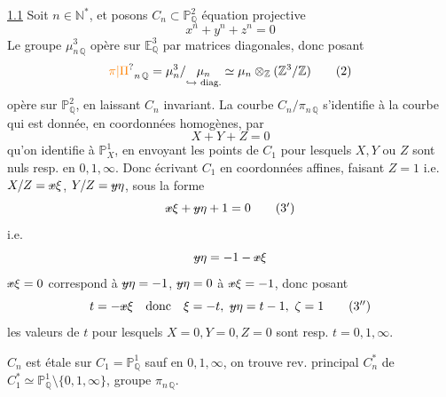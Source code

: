 \uline{1.1} Soit $n\in\mathbb N^*$, et posons
$C_n\subset\mathbb P^2_{\mathbb Q}$ équation projective
\[
x^n+y^n+z^n=0\tag*{(1)}
\]
Le groupe $\mu_{n\,\mathbb Q}^{3}$ opère sur $\mathbb E^3_{\mathbb Q}$ par matrices diagonales,
donc posant
\[
\unsure{\pi|\Pi}_{n\,\mathbb Q}=\mu_n^3/\underset{\text{\scriptsize$\hookrightarrow$ diag.}}{\mu_n}\simeq
\mu_n\otimes_{\mathbb Z}(\mathbb Z^3/\mathbb Z)\tag*{(2)}
\]
opère sur $\mathbb P^2_{\mathbb Q}$, en laissant $C_n$ invariant. La
courbe $C_n/\pi_{n\,\mathbb Q}$ s'identifie à la courbe  qui est
donnée, en coordonnées homogènes, par
\[
X+Y+Z=0\tag*{(3)}
\]
qu'on identifie à $\mathbb P^1_{X}$, en envoyant les
points de $C_1$ pour lesquels $X,Y$ ou $Z$ sont
nuls resp. en $0,1,\infty$. Donc écrivant $C_1$
en coordonnées affines, faisant $Z=1$
i.e. $X/Z=\deleted{x}\xi$, $Y/Z=\deleted{y}\eta$, sous la forme
\[
\deleted{x}\xi+\deleted{y}\eta+1=0\tag*{($3'$)}
\]
i.e.
\[
\deleted{y}\eta=-1-\deleted{x}\xi
\]
$\deleted{x}\xi=0$ correspond à $\deleted{y}\eta=-1$, $\deleted{y}\eta=0$ à $\deleted{x}\xi=-1$, donc
posant
\[
t=-\deleted{x}\xi\quad\text{donc}\quad \xi=-t,\ \deleted{y}\eta=t-1,\ \zeta=1\tag*{($3''$)}
\]
les valeurs de $t$ pour lesquels $X=0,Y=0,Z=0$
sont resp. $t=0,1,\infty$.

$C_n$ est étale sur $C_1=\mathbb P^1_{\mathbb Q}$ sauf en $0,1,\infty$, on
trouve rev.  principal $C_n^*$ de $C_1^*\simeq\mathbb P^1_{\mathbb Q}\setminus\{0,1,\infty\}$, groupe $\pi_{n\,\mathbb Q}$.

